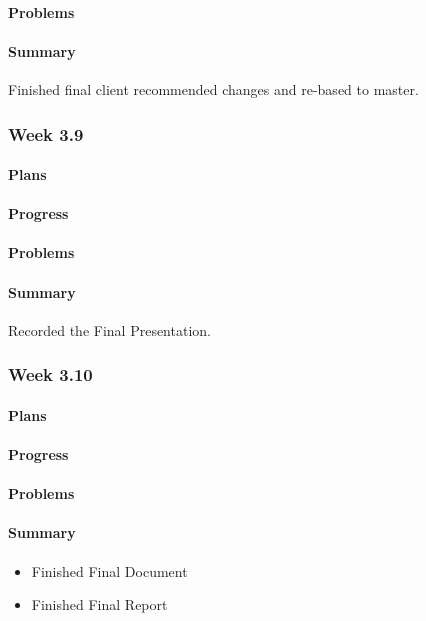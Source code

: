 \documentclass[onecolumn, draftclsnofoot,10pt, compsoc]{article}
\begin{document}
		    \paragraph{Problems} \hfill \break
		    \paragraph{Summary} \hfill \break
		        Finished final client recommended changes and re-based to master.
		    
		\subsubsection{Week 3.9}
		    \paragraph{Plans} \hfill \break
		    \paragraph{Progress} \hfill \break
		    \paragraph{Problems} \hfill \break
		    \paragraph{Summary} \hfill \break
		        Recorded the Final Presentation.
            
		\subsubsection{Week 3.10}
		    \paragraph{Plans} \hfill \break
		       
		    \paragraph{Progress} \hfill \break
		      
		    \paragraph{Problems} \hfill \break
		    
		    \paragraph{Summary} \hfill \break
		    	\begin{itemize}
                    \item Finished Final Document 
                    \item Finished Final Report 
                \end{itemize}
\end{document}

